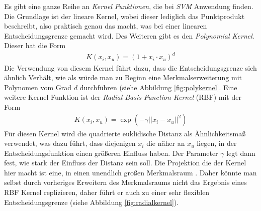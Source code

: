 \documentclass[
]{article}
\begin{document}
Es gibt eine ganze Reihe an \textit{Kernel Funktionen}, die bei
\textit{SVM} Anwendung finden. Die Grundlage ist der lineare Kernel,
wobei dieser lediglich das Punktprodukt beschreibt, also praktisch genau
das macht, was bei einer linearen Entscheidungsgrenze gemacht wird. Des
Weiteren gibt es den \textit{Polynomial Kernel}. Dieser hat die Form
\begin{align}
 K(x_i,x_u)=(1+x_i\cdot x_u)^d
\end{align} Die Verwendung von diesem Kernel führt dazu, dass die
Entscheidungsgrenze sich ähnlich Verhält, wie als würde man zu Beginn
eine Merkmalserweiterung mit Polynomen vom Grad \(d\) durchführen (siehe
Abbildung \ref{fig:polykernel}. Eine weitere Kernel Funktion ist der
\textit{Radial Basis Function Kernel} (RBF) mit der Form \begin{align}
K(x_i,x_u)=\exp\left(-\gamma ||x_i-x_u||^2\right)
\end{align} Für diesen Kernel wird die quadrierte euklidische Distanz
als Ähnlichkeitsmaß verwendet, was dazu führt, dass diejenigen \(x_i\)
die näher an \(x_u\) liegen, in der Entscheidungsfunktion einen größeren
Einfluss haben. Der Parameter \(\gamma\) legt dann fest, wie stark der
Einfluss der Distanz sein soll. Die Projektion die der Kernel hier macht
ist eine, in einen unendlich großen Merkmalsraum
\parencite{jamesIntroductionStatisticalLearning2021}. Daher könnte man
selbst durch vorheriges Erweitern des Merkmalsraums nicht das Ergebnis
eines RBF Kernel replizieren, daher führt er auch zu einer sehr
flexiblen Entscheidungsgrenze (siehe Abbildung
\ref{fig:radialkernel}).\\
\end{document}
